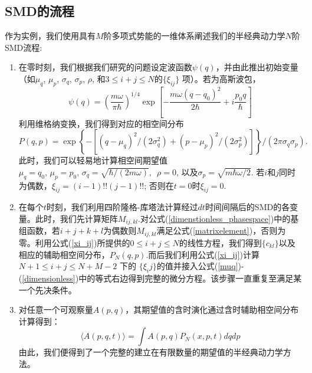 \subsection{SMD的流程}
作为实例，我们使用具有$M$阶多项式势能的一维体系阐述我们的半经典动力学$N$阶SMD流程:
\begin{enumerate}
	\item 在零时刻，我们根据我们研究的问题设定波函数$\psi(q)$，并由此推出初始变量（如$\mu_q$, $\mu_p$, $\sigma_q$, $\sigma_p$, $\rho$, 和$3\leq i+j \leq N$的$\{\xi_{ij}\}$ 项）。若为高斯波包，
	\begin{equation}
		\psi(q)=\left(\frac{m \omega}{\pi \hbar}\right)^{1 / 4} \exp \left[-\frac{m \omega\left(q-q_{0}\right)^{2}}{2 \hbar}+i \frac{p_{0} q}{\hbar}\right]
	\end{equation}
	利用维格纳变换，我们得到对应的相空间分布
	\begin{equation*}
	P(q,p) = \exp \left\{-\left[\left(q-\mu_{q}\right)^{2} /\left(2 \sigma_{q}^{2}\right)+\left(p-\mu_{p}\right)^{2} /\left(2 \sigma_{p}^{2}\right)\right]\right\} / (2\pi \sigma_q \sigma_p).
	\end{equation*}
	 此时，我们可以轻易地计算相空间期望值$\mu_{q}=q_{0}, \,\mu_{p}=p_{0},\, \sigma_{q}=\sqrt{\hbar /(2 m \omega)},\,$ $\rho=0,\,$以及$\sigma_p = \sqrt{m\hbar \omega /2 }$. 若$i$和$j$同时为偶数，$\xi_{ij} = (i-1)!!(j-1)!!$; 否则在$t=0$时$\xi_{ij} = 0$.
	\item 在每个$t$时刻，我们利用四阶隆格-库塔法计算经过$dt$时间间隔后的SMD的各变量。此时，我们先计算矩阵$M_{i j, k l}$.对公式(\ref{dimenstionless_phasespace})中的基组函数，若$i+j+k+l$为偶数则$M_{ij,kl}$满足公式(\ref{matrixelement})，否则为零。利用公式(\ref{xi_ij})所提供的$0\leq i + j \leq N$的线性方程，我们得到$\{c_{kl}\}$以及相应的辅助相空间分布，$P_N(q,p)$.而后我们利用公式(\ref{xi_ij})计算$N+1\leq i+j \leq N+M-2$ 下的 $\{\xi_ij\}$的值并接入公式(\ref{muq})-(\ref{dimensionless})中的等式右边得到完整的微分方程。该步骤一直重复至满足某一个先决条件。
	\item 对任意一个可观察量$A(p,q)$，其期望值的含时演化通过含时辅助相空间分布计算得到：
	\begin{equation}
		\langle A(p, q, t)\rangle=\int A(p, q) P_{N}(x, p, t) d q d p
	\end{equation}
	由此，我们便得到了一个完整的建立在有限数量的期望值的半经典动力学方法。
\end{enumerate}

